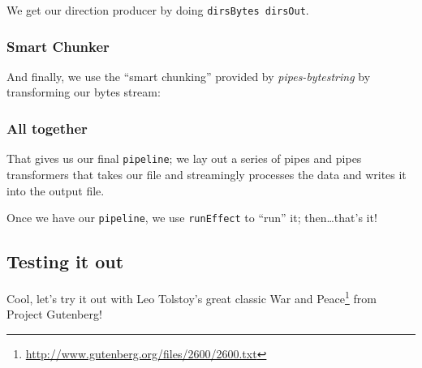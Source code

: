 \documentclass[]{article}
\newenvironment{Shaded}{}{}
\newcommand{\AttributeTok}[1]{\textcolor[rgb]{0.49,0.56,0.16}{#1}}
\newcommand{\CommentTok}[1]{\textcolor[rgb]{0.38,0.63,0.69}{\textit{#1}}}
\newcommand{\ExtensionTok}[1]{#1}
\newcommand{\NormalTok}[1]{#1}
\newcommand{\OperatorTok}[1]{\textcolor[rgb]{0.40,0.40,0.40}{#1}}
\newcommand{\OtherTok}[1]{\textcolor[rgb]{0.00,0.44,0.13}{#1}}
\newcommand{\PreprocessorTok}[1]{\textcolor[rgb]{0.74,0.48,0.00}{#1}}
\renewcommand{\href}[2]{#2\footnote{\url{#1}}}
\begin{document}
We get our direction producer by doing \texttt{dirsBytes\ dirsOut}.

\subsubsection{Smart Chunker}\label{smart-chunker}

And finally, we use the ``smart chunking'' provided by \emph{pipes-bytestring}
by transforming our bytes stream:

\begin{Shaded}
\end{Shaded}

\subsubsection{All together}\label{all-together}

That gives us our final \texttt{pipeline}; we lay out a series of pipes and
pipes transformers that takes our file and streamingly processes the data and
writes it into the output file.

Once we have our \texttt{pipeline}, we use \texttt{runEffect} to ``run'' it;
then\ldots that's it!

\subsection{Testing it out}\label{testing-it-out}

Cool, let's try it out with Leo Tolstoy's great classic
\href{http://www.gutenberg.org/files/2600/2600.txt}{War and Peace} from Project
Gutenberg!

\begin{Shaded}
\end{Shaded}
\end{document}

